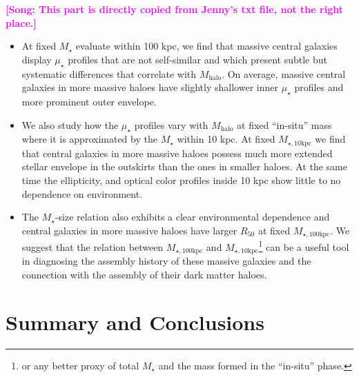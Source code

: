 \documentclass[a4paper,fleqn,usenatbib]{mnras}
\def\mstar{{$M_{\star}$}}
\def\mhalo{{$M_{\mathrm{halo}}$}}
\def\minn{{$M_{\star,10\mathrm{kpc}}$}}
\def\mtot{{$M_{\star,100\mathrm{kpc}}$}}
\def\mden{{$\mu_{\star}$}}
\newcommand{\song}[1]{\textcolor{magenta}{\textbf{[Song: #1]}}}
\begin{document}

   \song{This part is directly copied from Jenny's txt file, not the right place.}    
   \begin{itemize}
   
         \item At fixed \mstar{} evaluate within 100 kpc, we find that massive central 
            galaxies display \mden{} profiles that are not self-similar and which 
            present subtle but systematic differences that correlate with \mhalo{}.
            On average, massive central galaxies in more massive haloes have slightly 
            shallower inner \mden{} profiles and more prominent outer envelope.
            
        \item We also study how the \mden{} profiles vary with \mhalo{} at fixed 
            ``in-situ'' mass where it is approximated by the \mstar{} within 10 kpc. 
            At fixed \minn{} we find that central galaxies in more massive haloes 
            possess much more extended stellar envelope in the outskirts than the ones 
            in smaller haloes. 
            At the same time the ellipticity, and optical color profiles inside 10 kpc 
            show little to no dependence on environment.
        
        \item The \mstar{}-size relation also exhibits a clear environmental 
            dependence and central galaxies in more massive haloes have larger 
            $R_{\mathrm{50}}$ at fixed \mtot{}. 
            We suggest that the relation between \mtot{} and \minn{}\footnote{or any 
            better proxy of total \mstar{} and the mass formed in the ``in-situ'' phase.} 
            can be a useful tool in diagnosing the assembly history of these massive 
            galaxies and the connection with the assembly of their dark matter haloes.
  
   \end{itemize}


\section{Summary and Conclusions}
    \label{sec:summary}
\end{document}
